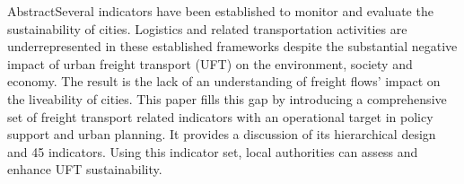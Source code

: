  AbstractSeveral indicators have been established to monitor and evaluate the sustainability of cities. Logistics and related transportation activities are underrepresented in these established frameworks despite the substantial negative impact of urban freight transport (UFT) on the environment, society and economy. The result is the lack of an understanding of freight flows’ impact on the liveability of cities. This paper fills this gap by introducing a comprehensive set of freight transport related indicators with an operational target in policy support and urban planning. It provides a discussion of its hierarchical design and 45 indicators. Using this indicator set, local authorities can assess and enhance UFT sustainability. 